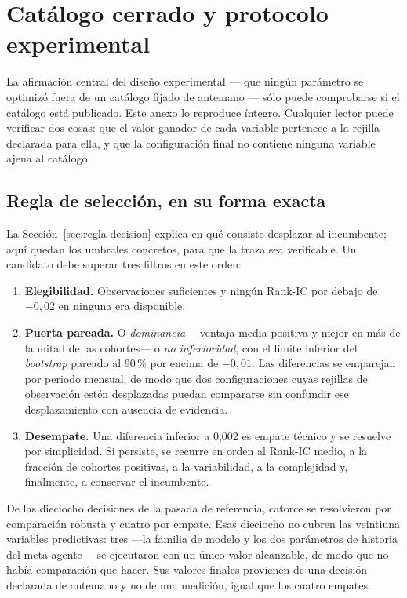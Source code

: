 \chapter{Catálogo cerrado y protocolo experimental}
\label{anexo:catalogo}

La afirmación central del diseño experimental --- que ningún parámetro se optimizó fuera de un
catálogo fijado de antemano --- sólo puede comprobarse si el catálogo está publicado. Este anexo lo
reproduce íntegro. Cualquier lector puede verificar dos cosas: que el valor ganador de cada variable
pertenece a la rejilla declarada para ella, y que la configuración final no contiene ninguna
variable ajena al catálogo.

\section{Regla de selección, en su forma exacta}

La Sección~\ref{sec:regla-decision} explica en qué consiste desplazar al incumbente; aquí quedan los
umbrales concretos, para que la traza sea verificable. Un candidato debe superar tres filtros en
este orden:

\begin{enumerate}[leftmargin=*,itemsep=0.35em]
  \item \textbf{Elegibilidad.} Observaciones suficientes y ningún Rank-IC por debajo de $-0{,}02$ en
  ninguna era disponible.
  \item \textbf{Puerta pareada.} O \emph{dominancia} ---ventaja media positiva y mejor en más de la
  mitad de las cohortes--- o \emph{no inferioridad}, con el límite inferior del \textit{bootstrap}
  pareado al 90\,\% por encima de $-0{,}01$. Las diferencias se emparejan por periodo mensual, de
  modo que dos configuraciones cuyas rejillas de observación estén desplazadas puedan compararse sin
  confundir ese desplazamiento con ausencia de evidencia.
  \item \textbf{Desempate.} Una diferencia inferior a 0,002 es empate técnico y se resuelve por
  simplicidad. Si persiste, se recurre en orden al Rank-IC medio, a la fracción de cohortes
  positivas, a la variabilidad, a la complejidad y, finalmente, a conservar el incumbente.
\end{enumerate}

De las dieciocho decisiones de la pasada de referencia, catorce se resolvieron por comparación
robusta y cuatro por empate. Esas dieciocho no cubren las veintiuna variables predictivas: tres
---la familia de modelo y los dos parámetros de historia del meta-agente--- se ejecutaron con un
único valor alcanzable, de modo que no había comparación que hacer. Sus valores finales provienen de
una decisión declarada de antemano y no de una medición, igual que los cuatro empates.

